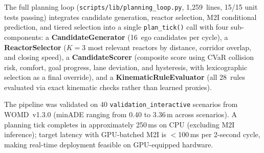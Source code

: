 The full planning loop (\texttt{scripts/lib/planning\_loop.py}, 1,259~lines, 15/15 unit tests passing) integrates candidate generation, reactor selection, M2I conditional prediction, and tiered selection into a single \texttt{plan\_tick()} call with four sub-components: a \textbf{CandidateGenerator} (16~ego candidates per cycle), a \textbf{ReactorSelector} ($K{=}3$ most relevant reactors by distance, corridor overlap, and closing speed), a \textbf{CandidateScorer} (composite score using CVaR collision risk, comfort, goal progress, lane deviation, and hysteresis, with lexicographic selection as a final override), and a \textbf{KinematicRuleEvaluator} (all 28~rules evaluated via exact kinematic checks rather than learned proxies).

The pipeline was validated on 40 \texttt{validation\_interactive} scenarios from WOMD~v1.3.0 (minADE ranging from 0.40 to 3.36\,m across scenarios).  A planning tick completes in approximately 250\,ms on CPU (excluding M2I inference); target latency with GPU-batched M2I is $<$100\,ms per 2-second cycle, making real-time deployment feasible on GPU-equipped hardware.
